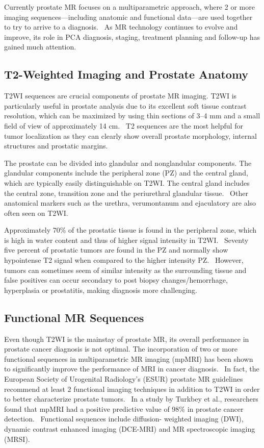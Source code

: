 Currently prostate MR focuses on a multiparametric approach, where 2 or more
imaging sequences—including anatomic and functional data—are used together to
try to arrive to a diagnosis.~\cite{Barentsz2012} As MR technology continues to evolve and
improve, its role in PCA diagnosis, staging, treatment planning and follow-up
has gained much attention.

\subsection{T2-Weighted Imaging and Prostate Anatomy}
T2WI sequences are crucial components of prostate MR imaging.  T2WI is
particularly useful in prostate analysis due to its excellent soft tissue
contrast resolution, which can be maximized by using thin sections of 3--4 mm
and a small field of view of approximately 14 cm.~\cite{Gupta2013,Bonekamp2011}
T2 sequences are the most helpful for tumor localization as they can clearly
show overall prostate morphology, internal structures and prostatic
margins.~\cite{Gupta2013}

The prostate can be divided into glandular and nonglandular components. The
glandular components include the peripheral zone (PZ) and the central gland,
which are typically easily distinguishable on T2WI. The central gland includes
the central zone, transition zone and the periurethral glandular
tissue.~\cite{Jung2012} Other anatomical markers such as the urethra,
verumontanum and ejaculatory are also often seen on T2WI. 

Approximately 70\% of the prostatic tissue is found in the peripheral zone,
which is high in water content and thus of higher signal intensity in
T2WI.~\cite{Jung2012} Seventy five percent of prostatic tumors are found in the
PZ and normally show hypointense T2 signal when compared to the higher
intensity PZ.~\cite{Hricak2007,Hegde2013} However, tumors can sometimes seem of
similar intensity as the surrounding tissue and false positives can occur
secondary to post biopsy changes/hemorrhage, hyperplasia or prostatitis, making
diagnosis more challenging.~\cite{Hegde2013}

\subsection{Functional MR Sequences}
Even though T2WI is the mainstay of prostate MR, its overall performance in
prostate cancer diagnosis is not optimal. The incorporation of two or more
functional sequences in multiparametric MR imaging (mpMRI) has been shown to
significantly improve the performance of MRI in cancer
diagnosis.~\cite{Turkbey2012} In fact, the European Society of Urogenital
Radiology’s (ESUR) prostate MR guidelines recommend at least 2 functional
imaging techniques in addition to T2WI in order to better characterize prostate
tumors.~\cite{Barentsz2012} In a study by Turkbey et al., researchers found that mpMRI had a
positive predictive value of 98\% in prostate cancer
detection.~\cite{Turkbey2012} Functional sequences include diffusion- weighted
imaging (DWI), dynamic contrast enhanced imaging (DCE-MRI) and MR spectroscopic
imaging (MRSI). 

